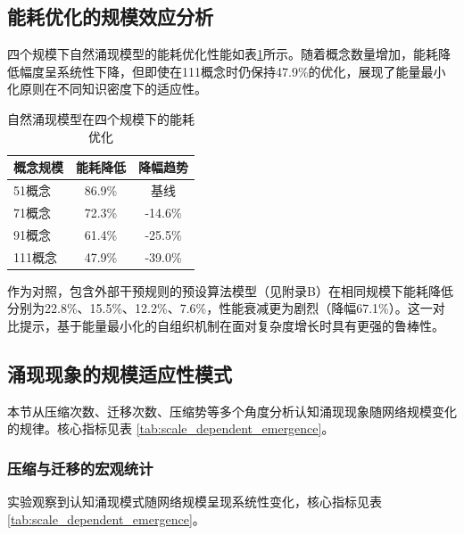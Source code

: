 \documentclass[12pt,a4paper]{article}
\begin{document}
\subsection{能耗优化的规模效应分析}

四个规模下自然涌现模型的能耗优化性能如表\ref{tab:multi_scale_energy}所示。随着概念数量增加，能耗降低幅度呈系统性下降，但即使在111概念时仍保持47.9\%的优化，展现了能量最小化原则在不同知识密度下的适应性。

\begin{table}[h]
\centering
\caption{自然涌现模型在四个规模下的能耗优化}
\label{tab:multi_scale_energy}
\begin{tabular}{lcc}
\toprule
\textbf{概念规模} & \textbf{能耗降低} & \textbf{降幅趋势} \\
\midrule
51概念 & 86.9\% & 基线 \\
71概念 & 72.3\% & -14.6\% \\
91概念 & 61.4\% & -25.5\% \\
111概念 & 47.9\% & -39.0\% \\
\bottomrule
\end{tabular}
\end{table}

作为对照，包含外部干预规则的预设算法模型（见附录B）在相同规模下能耗降低分别为22.8\%、15.5\%、12.2\%、7.6\%，性能衰减更为剧烈（降幅67.1\%）。这一对比提示，基于能量最小化的自组织机制在面对复杂度增长时具有更强的鲁棒性。

\subsection{涌现现象的规模适应性模式}
\label{sec:scale_dependent_emergence}

本节从压缩次数、迁移次数、压缩势等多个角度分析认知涌现现象随网络规模变化的规律。核心指标见表 \ref{tab:scale_dependent_emergence}。

\subsubsection{压缩与迁移的宏观统计}

实验观察到认知涌现模式随网络规模呈现系统性变化，核心指标见表 \ref{tab:scale_dependent_emergence}。
\end{document}
